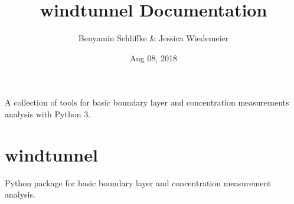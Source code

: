 \documentclass[letterpaper,10pt,english]{sphinxmanual}
\title{windtunnel Documentation}
\date{Aug 08, 2018}
\author{Benyamin Schliffke \& Jessica Wiedemeier}
\begin{document}
\maketitle
\sphinxtableofcontents
{}\label{\detokenize{index::doc}}


A collection of tools for basic boundary layer and concentration measurements analysis with Python 3.


\chapter{windtunnel}
\label{\detokenize{index:module-windtunnel}}\label{\detokenize{index:windtunnel}}\label{\detokenize{index:welcome-to-windtunnel-s-documentation}}
Python package for basic boundary layer and concentration measurement analysis.
\end{document}
